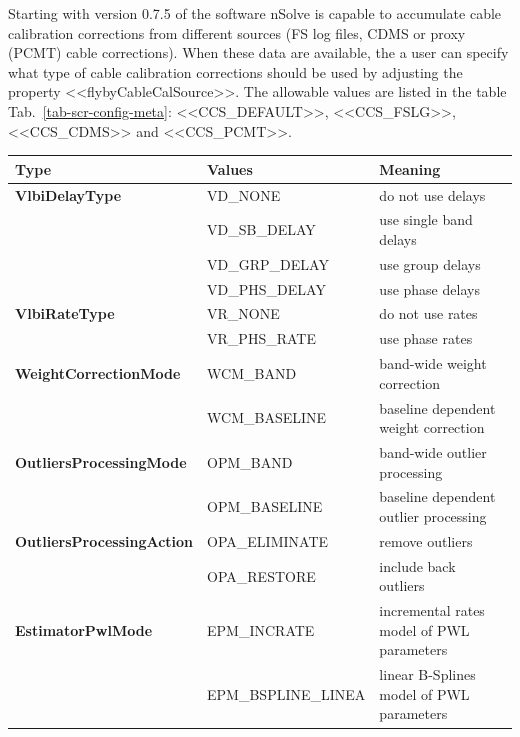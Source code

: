 \documentclass [10pt,letterpaper]{report}
\newcommand{\nuSolve}{\greektext n\latintext Solve}
\begin{document}
Starting with version 0.7.5 of the software \nuSolve{} is capable to accumulate cable calibration corrections
from different sources (FS log files, CDMS or proxy (PCMT) cable corrections). When these data are
available, the a user can specify what type of cable calibration corrections should be used by
adjusting the property <<flybyCableCalSource>>. The allowable values are listed in the table
Tab.~\ref{tab-scr-config-meta}: <<CCS\_DEFAULT>>, <<CCS\_FSLG>>, <<CCS\_CDMS>> and <<CCS\_PCMT>>.




\begin{table}[htb]
\centering
\footnotesize
\begin{tabular}{llp{}}
\hline
Type & Values & Meaning\\
\hline
  {\bf VlbiDelayType}           & VD\_NONE            & do not use delays \\
                                & VD\_SB\_DELAY       & use single band delays \\
                                & VD\_GRP\_DELAY      & use group delays \\
                                & VD\_PHS\_DELAY      & use phase delays \\
\hline
  {\bf VlbiRateType}            & VR\_NONE            & do not use rates\\
                                & VR\_PHS\_RATE       & use phase rates \\
\hline
  {\bf WeightCorrectionMode}    & WCM\_BAND           & band-wide weight correction\\
                                & WCM\_BASELINE       & baseline dependent weight correction\\
\hline
  {\bf OutliersProcessingMode}  & OPM\_BAND           & band-wide outlier processing\\
                                & OPM\_BASELINE       & baseline dependent outlier processing\\
\hline
  {\bf OutliersProcessingAction}& OPA\_ELIMINATE      & remove outliers\\
                                & OPA\_RESTORE        & include back outliers\\
\hline
  {\bf EstimatorPwlMode}        & EPM\_INCRATE        & incremental rates model of PWL parameters\\
                                & EPM\_BSPLINE\_LINEA & linear B-Splines model of PWL parameters\\

\end{tabular}
\end{table}
\end{document}
